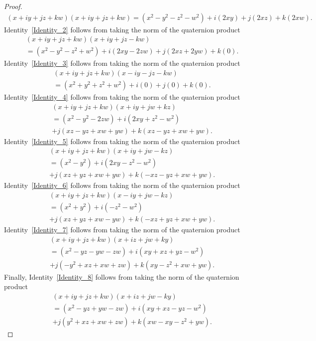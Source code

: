 \documentclass[12pt,table]{article}
\numberwithin{equation}{section}
\begin{document}
\begin{landscape}
{{\begin{proof}
\begin{align*}
    (x + iy + jz + kw)(x + iy + jz + kw) 
    = (x^2 - y^2 - z^2 - w^2 ) + i(2xy) + j(2xz) + k(2xw).
    \end{align*}
Identity~\eqref{Identity_2} follows from taking the norm of the quaternion product    
    \begin{align*}
    &(x + iy + jz + kw)(x + iy + jz - kw) \\
    &= (x^2 - y^2 - z^2 + w^2 ) + i(2xy - 2zw) + j(2xz + 2yw) + k(0). 
    \end{align*}
Identity~\eqref{Identity_3} follows from taking the norm of the quaternion product        
    \begin{align*}
    &(x + iy + jz + kw)(x - iy - jz - kw) \\
    &= (x^2 + y^2 + z^2 + w^2 ) + i(0) + j(0) + k(0).
    \end{align*}
Identity~\eqref{Identity_4} follows from taking the norm of the quaternion product        
    \begin{align*}
    &(x + iy + jz + kw)(x + iy + jw + kz) \\
    &= (x^2 - y^2 - 2zw ) + i(2xy + z^2 -w^2) \\
        &+ j(xz - yz + xw + yw) + k(xz - yz + xw + yw).
    \end{align*}
Identity~\eqref{Identity_5} follows from taking the norm of the quaternion product            
    \begin{align*}
    &(x + iy + jz + kw)(x + iy + jw - kz) \\
    &= (x^2 - y^2 ) + i(2xy - z^2 - w^2) \\
        &+ j(xz + yz + xw + yw) + k(-xz - yz + xw + yw).
    \end{align*}
Identity~\eqref{Identity_6} follows from taking the norm of the quaternion product
    \begin{align*}
    &(x + iy + jz + kw)(x - iy + jw - kz) \\
    &= (x^2 + y^2 ) + i(- z^2 - w^2) \\
        &+ j(xz + yz + xw - yw) + k(-xz + yz + xw + yw).
    \end{align*}
Identity~\eqref{Identity_7} follows from taking the norm of the quaternion product
    \begin{align*}
    &(x + iy + jz + kw)(x + iz + jw + ky) \\
    &= (x^2 - yz - yw - zw ) + i(xy + xz + yz - w^2) \\
        &+ j(-y^2 + xz + xw + zw) + k(xy - z^2 + xw + yw).
    \end{align*}
Finally, Identity~\eqref{Identity_8} follows from taking the norm of the quaternion product    
    \begin{align*}
    &(x + iy + jz + kw)(x + iz + jw - ky) \\
    &= (x^2 - yz + yw - zw ) + i(xy + xz - yz - w^2) \\
        &+ j(y^2 + xz + xw + zw) + k(xw - xy - z^2  + yw). \tag*{\qedhere}
    \end{align*}
\end{proof}


}}
\end{landscape}
\end{document}
